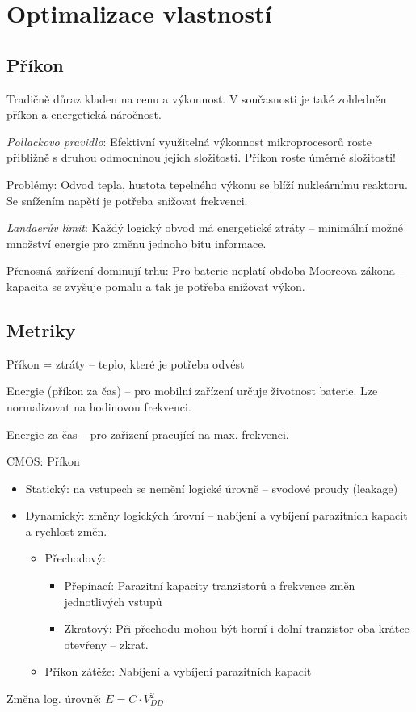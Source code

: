 \documentclass[a4paper, 11pt]{report}
\begin{document}
\section{Optimalizace vlastností}
\subsection{Příkon}

Tradičně důraz kladen na cenu a výkonnost. V současnosti je také zohledněn příkon a energetická náročnost.

\emph{Pollackovo pravidlo}: Efektivní využitelná výkonnost mikroprocesorů roste přibližně s druhou odmocninou jejich složitosti. Příkon roste úměrně složitosti!

Problémy: Odvod tepla, hustota tepelného výkonu se blíží nukleárnímu reaktoru. Se snížením napětí je potřeba snižovat frekvenci.

\emph{Landaerův limit}: Každý logický obvod má energetické ztráty -- minimální možné množství energie pro změnu jednoho bitu informace.

Přenosná zařízení dominují trhu: Pro baterie neplatí obdoba Mooreova zákona -- kapacita se zvyšuje pomalu a tak je potřeba snižovat výkon.

\subsection{Metriky}
Příkon = ztráty -- teplo, které je potřeba odvést

Energie (příkon za čas) -- pro mobilní zařízení určuje životnost baterie. Lze normalizovat na hodinovou frekvenci.

Energie za čas -- pro zařízení pracující na max. frekvenci.

CMOS: Příkon
\begin{itemize}
	\item Statický: na vstupech se nemění logické úrovně -- svodové proudy (leakage)
	\item Dynamický: změny logických úrovní -- nabíjení a vybíjení parazitních kapacit a rychlost změn.
	\begin{itemize}
		\item Přechodový:
		\begin{itemize}
			\item Přepínací: Parazitní kapacity tranzistorů a frekvence změn jednotlivých vstupů
			\item Zkratový: Při přechodu mohou být horní i dolní tranzistor oba krátce otevřeny -- zkrat.
		\end{itemize}
		\item Příkon zátěže: Nabíjení a vybíjení parazitních kapacit
	\end{itemize}
\end{itemize}
Změna log. úrovně: $E = C \cdot V_{DD}^2$
\end{document}
